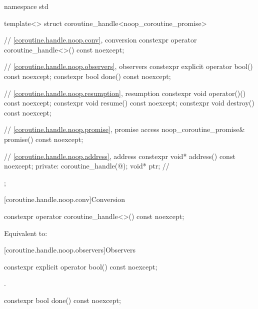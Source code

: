 %
\begin{codeblock}
namespace std {
  template<>
  struct coroutine_handle<noop_coroutine_promise> {
    // \ref{coroutine.handle.noop.conv}, conversion
    constexpr operator coroutine_handle<>() const noexcept;

    // \ref{coroutine.handle.noop.observers}, observers
    constexpr explicit operator bool() const noexcept;
    constexpr bool done() const noexcept;

    // \ref{coroutine.handle.noop.resumption}, resumption
    constexpr void operator()() const noexcept;
    constexpr void resume() const noexcept;
    constexpr void destroy() const noexcept;

    // \ref{coroutine.handle.noop.promise}, promise access
    noop_coroutine_promise& promise() const noexcept;

    // \ref{coroutine.handle.noop.address}, address
    constexpr void* address() const noexcept;
  private:
    coroutine_handle(@\unspec@);
    void* ptr;  // \expos
  };
}
\end{codeblock}

[coroutine.handle.noop.conv]{Conversion}

%
\begin{itemdecl}
constexpr operator coroutine_handle<>() const noexcept;
\end{itemdecl}

\begin{itemdescr}
\pnum
\effects
Equivalent to: 
\end{itemdescr}

[coroutine.handle.noop.observers]{Observers}

%
\begin{itemdecl}
constexpr explicit operator bool() const noexcept;
\end{itemdecl}

\begin{itemdescr}
\pnum
\returns
{}.
\end{itemdescr}

%
\begin{itemdecl}
constexpr bool done() const noexcept;
\end{itemdecl}

